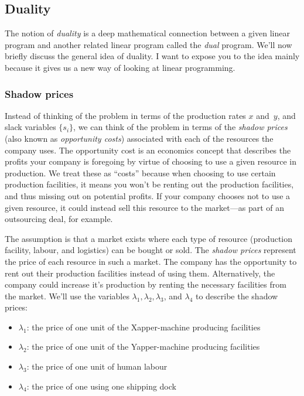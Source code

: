 \documentclass[11pt,oneside]{article}
\begin{document}
		
		
		
		
				
	\subsection{Duality}
	
		The notion of \emph{duality} is a deep mathematical connection between a given linear program 
		and another related linear program called the \emph{dual} program.
		We'll now briefly discuss the general idea of duality.
		I want to expose you to the idea mainly because it gives us a new way of looking at linear programming.
		
		\subsubsection{Shadow prices}
			
			Instead of thinking of the problem in terms of the production rates $x$ and~$y$,
			and slack variables $\{ s_i \}$, 
			we can think of the problem in terms of the \emph{shadow prices} (also known as \emph{opportunity costs}) 
			associated with each of the resources the company uses. 
			The opportunity cost is an economics concept that describes the profits your company is foregoing 
			by virtue of choosing to use a given resource in production.
			We treat these as ``costs'' because when choosing to use certain production facilities,
			it means you won't be renting out the production facilities, and thus missing out on potential profits.			
			If your company chooses not to use a given resource,
			it could instead sell this resource to the market---as part of an outsourcing deal, for example.

			The assumption is that a market exists where each type of resource (production facility, labour, and logistics) can be bought or sold.
			The \emph{shadow prices} represent the price of each resource in such a market.
			The company has the opportunity to rent out their production facilities instead of using them. 
			Alternatively, the company could increase it's production by renting the necessary facilities from the market.
			We'll use the variables $\lambda_1, \lambda_2, \lambda_3$, and $\lambda_4$ to describe the shadow prices:
			
			\begin{itemize}
				\item $\lambda_1$: the price of one unit of the Xapper-machine producing facilities
				\item $\lambda_2$: the price of one unit of the Yapper-machine producing facilities
				\item $\lambda_3$: the price of one unit of human labour 
				\item $\lambda_4$: the price of one using one shipping dock 
			\end{itemize}
			
\end{document}
